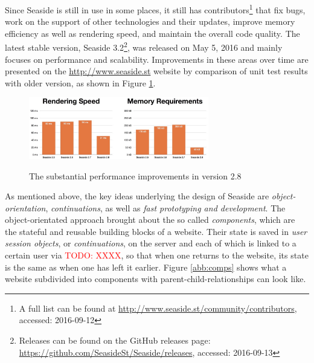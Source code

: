 \documentclass[a4paper,12pt,pagesize,headsepline,oribibl,titlepage]{scrartcl}
\newcommand{\todo}[1]{\textcolor{red}{TODO: #1}\PackageWarning{TODO:}{#1!}}
\begin{document}
Since Seaside is still in use in some places, it still has contributors\footnote{A full list can be found at \url{http://www.seaside.st/community/contributors}, accessed: 2016-09-12} that fix bugs, work on the support of other technologies and their updates, improve memory efficiency as well as rendering speed, and maintain the overall code quality. 
The latest stable version, Seaside 3.2\footnote{Releases can be found on the GitHub releases page: \url{https://github.com/SeasideSt/Seaside/releases}, accessed: 2016-09-13}, was released on May 5, 2016 and mainly focuses on performance and scalability. Improvements in these areas over time are presented on the \url{http://www.seaside.st} website by comparison of unit test results with older version, as shown in Figure \ref{fig:performance}.

\begin{figure}[hbp]
\begin{center}
\includegraphics*[width=0.7\textwidth]{images/performance.png}\\
\caption{The substantial performance improvements in version 2.8}
\label{fig:performance}
\end{center}
\end{figure}

As mentioned above, the key ideas underlying the design of Seaside are \emph{object-orientation}, \emph{continuations}, as well as \emph{fast prototyping and development}.
The object-orientated approach brought about the so called \emph{components}, which are the stateful and reusable building  blocks of a website. Their state is saved in \emph{user session objects}, or \emph{continuations}, on the server and each of which is linked to a certain user via \todo{XXXX}, so that when one returns to the website, its state is the same as when one has left it earlier. Figure \ref{abb:comps} shows what a website subdivided into components with parent-child-relationships can look like.
\end{document}
